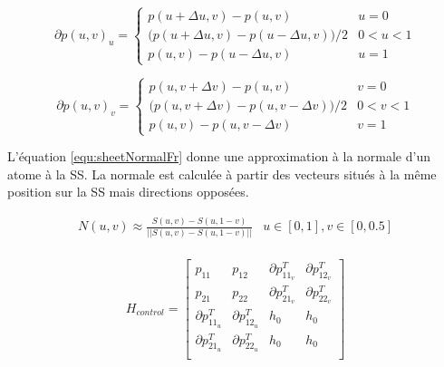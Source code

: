 \begin{equation}
 \partial p(u, v)_u = \left \{ \begin{array}{ll}
                      p(u + \Delta u, v) - p(u , v) & u = 0\\
                      \big (p(u + \Delta u, v) - p(u - \Delta u, v)\big )/2 & 0 < u < 1 \\
                      p(u, v) - p(u - \Delta u, v) & u = 1
                     \end{array} \right .
\label{equ:pDerivativeUFr}
\end{equation}

\begin{equation}
 \partial p(u, v)_v = \left \{ \begin{array}{ll}
                      p(u, v + \Delta v) - p(u, v) & v = 0\\
                      \big (p(u, v + \Delta v) - p(u, v - \Delta v) \big ) /2 & 0 < v < 1 \\
                      p(u, v) - p(u, v - \Delta v) & v = 1
                     \end{array} \right .
\label{equ:pDerivativeVFr}
\end{equation}

L'équation \ref{equ:sheetNormalFr} donne une approximation à la normale d'un atome à la SS.
La normale est calculée à partir des vecteurs situés à la même position sur la SS
mais directions opposées.

\begin{equation}
  \begin{array}{cc}
   N(u, v) \approx \frac{S(u, v) - S(u, 1 - v)}{||S(u, v) - S(u, 1 - v)||}  & u  \in [0, 1], v \in [0, 0.5] \\
  \end{array}
\label{equ:sheetNormalFr}
\end{equation}

\begin{equation}
 H_{control} = \left [ \begin{array}{cccc}
                    p_{11} & p_{12} 			& \partial p_{{11}_v}^T & \partial p_{{12}_v}^T \\
                    p_{21} & p_{22}			& \partial p_{{21}_v}^T & \partial p_{{22}_v}^T \\
                    \partial p_{{11}_u}^T & \partial p_{{12}_u}^T	& h_{0} & h_{0} \\
                    \partial p_{{21}_u}^T & \partial p_{{22}_u}^T	& h_{0} & h_{0} \\
                    
                   \end{array} \right ]
  \label{equ:hermiteControlFr}
\end{equation}

